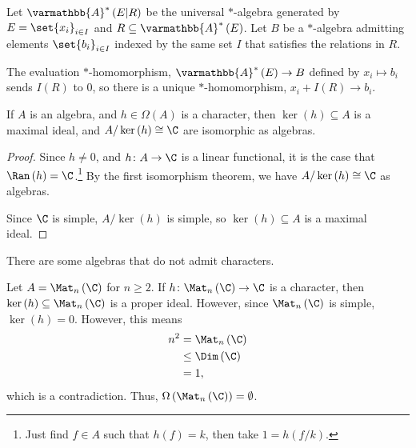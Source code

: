 \documentclass[10pt]{mypackage}
\renewcommand*{\mathbb}[1]{\varmathbb{#1}}
\newcommand{\A}{\mathbb{A}}
\begin{document}
\begin{example}
  Let $\A^{\ast}\left(E|R\right)$ be the universal $\ast$-algebra generated by $E= \set{x_i}_{i\in I}$ and $R\subseteq \A^{\ast}\left(E\right)$. Let $B $ be a $\ast$-algebra admitting elements $\set{b_i}_{i\in I}$ indexed by the same set $I$ that satisfies the relations in $R$.\newline

  The evaluation $\ast$-homomorphism, $\A^{\ast}\left(E\right)\rightarrow B$ defined by $x_i \mapsto b_i$ sends $I(R)$ to $0$, so there is a unique $\ast$-homomorphism, $x_i + I(R)\rightarrow b_i$.
\end{example}
\begin{corollary}
  If $A$ is an algebra, and $h\in \Omega\left(A\right)$ is a character, then $\ker\left(h\right)\subseteq A$ is a maximal ideal, and $A/\ker\left(h\right)\cong \C$ are isomorphic as algebras.
\end{corollary}
\begin{proof}
  Since $h\neq 0$, and $h\colon A\rightarrow \C$ is a linear functional, it is the case that $\Ran\left(h\right) = \C$.\footnote{Just find $f\in A$ such that $h(f) = k$, then take $1 = h\left(f/k\right)$.} By the first isomorphism theorem, we have $A/\ker\left(h\right) \cong \C$ as algebras. \newline

  Since $\C$ is simple, $A/\ker\left(h\right)$ is simple, so $\ker\left(h\right) \subseteq A$ is a maximal ideal.
\end{proof}
There are some algebras that do not admit characters.
\begin{example}
  Let $A = \Mat_n\left(\C\right)$ for $n\geq 2$. If $h\colon \Mat_n\left(\C\right)\rightarrow \C$ is a character, then $\ker\left(h\right)\subseteq \Mat_n\left(\C\right)$ is a proper ideal. However, since $\Mat_n\left(\C\right)$ is simple, $\ker\left(h\right) = 0$. However, this means
  \begin{align*}
    n^2 &= \Mat_n\left(\C\right)\\
        &\leq \Dim\left(\C\right)\\
        &= 1,
  \end{align*}
  which is a contradiction. Thus, $\Omega\left(\Mat_n\left(\C\right)\right) = \emptyset$.
\end{example}
\end{document}
